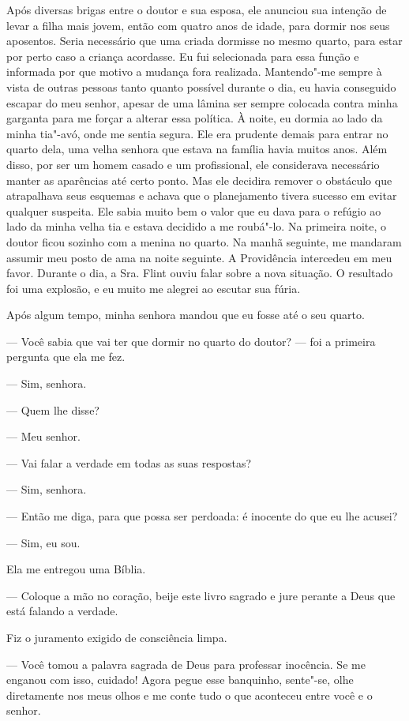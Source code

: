 Após diversas brigas entre o doutor e
sua esposa, ele anunciou sua intenção de levar a filha mais jovem, então
com quatro anos de idade, para dormir nos seus aposentos. Seria
necessário que uma criada dormisse no mesmo quarto, para estar por perto
caso a criança acordasse. Eu fui selecionada para essa função e
informada por que motivo a mudança fora realizada. Mantendo"-me sempre à
vista de outras pessoas tanto quanto possível durante o dia, eu havia
conseguido escapar do meu senhor, apesar de uma lâmina ser sempre
colocada contra minha garganta para me forçar a alterar essa política. À
noite, eu dormia ao lado da minha tia"-avó, onde me sentia segura. Ele
era prudente demais para entrar no quarto dela, uma velha senhora que
estava na família havia muitos anos. Além disso, por ser um homem casado
e um profissional, ele considerava necessário manter as aparências até
certo ponto. Mas ele decidira remover o obstáculo que atrapalhava seus
esquemas e achava que o planejamento tivera sucesso em evitar qualquer
suspeita. Ele sabia muito bem o valor que eu dava para o refúgio ao lado
da minha velha tia e estava decidido a me roubá"-lo. Na primeira noite, o
doutor ficou sozinho com a menina no quarto. Na manhã seguinte, me
mandaram assumir meu posto de ama na noite seguinte. A Providência
intercedeu em meu favor. Durante o dia, a Sra. Flint ouviu falar sobre a
nova situação. O resultado foi uma explosão, e eu muito me alegrei ao
escutar sua fúria.

Após algum tempo, minha senhora mandou
que eu fosse até o seu quarto.

--- Você sabia que vai ter que dormir no quarto do doutor? --- foi a
primeira pergunta que ela me fez.

--- Sim, senhora.

--- Quem lhe disse?

--- Meu senhor.

--- Vai falar a verdade em todas as
suas respostas?

--- Sim, senhora.

--- Então me diga, para que possa ser
perdoada: é inocente do que eu lhe acusei?

--- Sim, eu sou.

Ela me entregou uma Bíblia.

--- Coloque a mão no coração, beije este livro sagrado e jure perante a
Deus que está falando a verdade.

Fiz o juramento exigido de consciência
limpa.

--- Você tomou a palavra sagrada de
Deus para professar inocência. Se me enganou com isso, cuidado! Agora
pegue esse banquinho, sente"-se, olhe diretamente nos meus olhos e me
conte tudo o que aconteceu entre você e o senhor.

